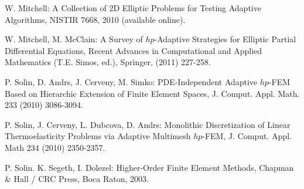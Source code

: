 \documentclass[12pt]{elsarticle}
\begin{document}
\begin{thebibliography}{[KLR73]}

W. Mitchell: A Collection of 2D Elliptic Problems for
Testing Adaptive Algorithms, NISTIR 7668, 2010 (available online).

\vspace{-2mm}

W. Mitchell, M. McClain:
A Survey of $hp$-Adaptive Strategies for Elliptic Partial Differential Equations,
Recent Advances in Computational and Applied Mathematics (T.E. Simos, ed.),
Springer, (2011) 227-258.
\vspace{-2mm}

P. Solin, D. Andrs, J. Cerveny, M. Simko:
PDE-Independent Adaptive $hp$-FEM Based on Hierarchic Extension of Finite Element Spaces,
J. Comput. Appl. Math. 233 (2010) 3086-3094.

\vspace{-2mm}

P. Solin, J. Cerveny, L. Dubcova, D. Andrs:
Monolithic Discretization of Linear Thermoelasticity Problems
via Adaptive Multimesh $hp$-FEM, J. Comput. Appl. Math 234 (2010) 2350-2357.

\vspace{-2mm}

P. Solin. K. Segeth, I. Dolezel: Higher-Order Finite Element Methods, Chapman \& Hall
/ CRC Press, Boca Raton, 2003.
\end{thebibliography}

\end{document}
